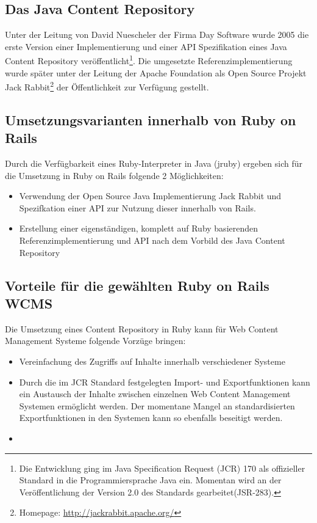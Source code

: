 \subsection{Das Java Content Repository}

Unter der Leitung von David Nuescheler der Firma Day Software wurde 2005 die erste Version einer Implementierung und einer API Spezifikation eines Java Content Repository veröffentlicht\footnote{Die Entwicklung ging im Java Specification Request (JCR) 170 als offizieller Standard in die Programmiersprache Java ein. Momentan wird an der Veröffentlichung der Version 2.0 des Standards gearbeitet(JSR-283).}. Die umgesetzte Referenzimplementierung wurde später unter der Leitung der Apache Foundation als Open Source Projekt Jack Rabbit\footnote{Homepage: \href{http://jackrabbit.apache.org/}{http://jackrabbit.apache.org/}} der Öffentlichkeit zur Verfügung gestellt.


\subsection{Umsetzungsvarianten innerhalb von Ruby on Rails}

Durch die Verfügbarkeit eines Ruby-Interpreter in Java (jruby) ergeben sich für die Umsetzung in Ruby on Rails folgende 2 Möglichkeiten:

\begin{itemize}
\item
Verwendung der Open Source Java Implementierung Jack Rabbit und Spezifkation einer API zur Nutzung dieser innerhalb von Rails.
\item
Erstellung einer eigenständigen, komplett auf Ruby basierenden Referenzimplementierung und API nach dem Vorbild des Java Content Repository
\end{itemize}



\subsection{Vorteile für die gewählten Ruby on Rails WCMS}

Die Umsetzung eines Content Repository in Ruby kann für Web Content Management Systeme folgende Vorzüge bringen:

\begin{itemize}
\item Vereinfachung des Zugriffs auf Inhalte innerhalb verschiedener Systeme
\item Durch die im JCR Standard festgelegten Import- und Exportfunktionen kann ein Austausch der Inhalte zwischen einzelnen Web Content Management Systemen ermöglicht werden. Der momentane Mangel an standardisierten Exportfunktionen in den Systemen kann so ebenfalls beseitigt werden.
\item

\end{itemize}



